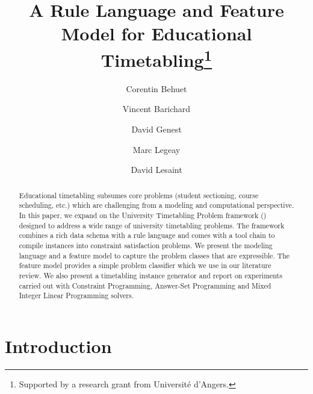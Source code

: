 \documentclass[runningheads]{llncs}
\begin{document}
\newcommand{\attending}{attending}
\newcommand{\studentoverlap}{session-overlap}
\newcommand{\sectioning}{sectioning}

\newcommand{\aspects}{crosscutting}
\newcommand{\availability}{calendar}
\newcommand{\periodicity}{regularity}
\newcommand{\sessiondistribution}{orchestration}
\newcommand{\travel}{workload}
\newcommand{\adjacency}{logistics}
\newcommand{\resourcedistribution}{resourcing}




\newcommand{\medcirc}{\text{\raisebox{0.25ex}{\large$\circ$}}}
\newcommand{\medbullet}{\text{\raisebox{0.25ex}{\large$\bullet$}}}\clearpage{}

\title{A Rule Language and Feature Model for Educational Timetabling\thanks{Supported by a research grant from Université d'Angers.}}
\author{
Corentin Behuet \and
Vincent Barichard \and
David Genest \and
Marc Legeay \and
David Lesaint
}
\maketitle              

\begin{abstract}
Educational timetabling
subsumes core problems
(student sectioning,
course scheduling, 
etc.)
which are challenging from a modeling and computational perspective.
In this paper, we expand on the 
University Timetabling Problem
framework (\UTP{})  designed to address a wide range of university timetabling problems.
The framework combines a rich data schema with a rule language
and comes with a tool chain to compile instances 
into constraint satisfaction problems.
We present the \UTP{} modeling language
and a feature model
to capture the problem classes that are expressible. The feature model provides a simple problem classifier which we use in our literature review. We also present a timetabling instance generator
and report on experiments carried out 
with Constraint Programming, 
Answer-Set Programming and 
Mixed Integer Linear Programming solvers. 

\end{abstract} \section{Introduction}
\end{document}
